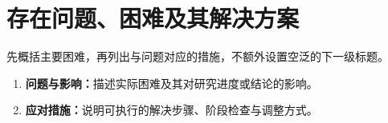 \section{存在问题、困难及其解决方案}
先概括主要困难，再列出与问题对应的措施，不额外设置空泛的下一级标题。
\begin{enumerate}[label=(\arabic*),leftmargin=2.5em]
\item \textbf{问题与影响：}描述实际困难及其对研究进度或结论的影响。
\item \textbf{应对措施：}说明可执行的解决步骤、阶段检查与调整方式。
\end{enumerate}

